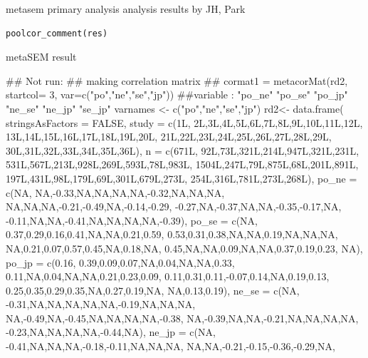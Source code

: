 \documentclass[a4paper]{book}
\begin{document}
%
\begin{Description}
metasem primary analysis analysis results by JH, Park
\end{Description}
%
\begin{Usage}
\begin{verbatim}
poolcor_comment(res)
\end{verbatim}
\end{Usage}
%
\begin{Arguments}
\begin{ldescription}
\item[\code{res}] metaSEM result
\end{ldescription}
\end{Arguments}
%
\begin{Examples}
\begin{ExampleCode}
\#\# Not run: 
## making correlation matrix ##
cormat1 = metacorMat(rd2, startcol= 3, var=c("po","ne","se","jp"))
 ##variable : "po_ne" "po_se" "po_jp" "ne_se" "ne_jp" "se_jp"
 varnames <- c("po","ne","se","jp")
rd2<- data.frame(
  stringsAsFactors = FALSE,
  study = c(1L,
            2L,3L,4L,5L,6L,7L,8L,9L,10L,11L,12L,
            13L,14L,15L,16L,17L,18L,19L,20L,
            21L,22L,23L,24L,25L,26L,27L,28L,29L,
            30L,31L,32L,33L,34L,35L,36L),
  n = c(671L,
        92L,73L,321L,214L,947L,321L,231L,
        531L,567L,213L,928L,269L,593L,78L,983L,
        1504L,247L,79L,875L,68L,201L,891L,
        197L,431L,98L,179L,69L,301L,679L,273L,
        254L,316L,781L,273L,268L),
  po_ne = c(NA,
            NA,-0.33,NA,NA,NA,NA,-0.32,NA,NA,NA,
            NA,NA,NA,-0.21,-0.49,NA,-0.14,-0.29,
            -0.27,NA,-0.37,NA,NA,-0.35,-0.17,NA,
            -0.11,NA,NA,-0.41,NA,NA,NA,NA,-0.39),
  po_se = c(NA,
            0.37,0.29,0.16,0.41,NA,NA,0.21,0.59,
            0.53,0.31,0.38,NA,NA,0.19,NA,NA,NA,
            NA,0.21,0.07,0.57,0.45,NA,0.18,NA,
            0.45,NA,NA,0.09,NA,NA,0.37,0.19,0.23,
            NA),
  po_jp = c(0.16,
            0.39,0.09,0.07,NA,0.04,NA,NA,0.33,
            0.11,NA,0.04,NA,NA,0.21,0.23,0.09,
            0.11,0.31,0.11,-0.07,0.14,NA,0.19,0.13,
            0.25,0.35,0.29,0.35,NA,0.27,0.19,NA,
            NA,0.13,0.19),
  ne_se = c(NA,
            -0.31,NA,NA,NA,NA,NA,-0.19,NA,NA,NA,
            NA,-0.49,NA,-0.45,NA,NA,NA,NA,-0.38,
            NA,-0.39,NA,NA,-0.21,NA,NA,NA,NA,
            -0.23,NA,NA,NA,NA,-0.44,NA),
  ne_jp = c(NA,
            -0.41,NA,NA,NA,-0.18,-0.11,NA,NA,NA,
            NA,NA,-0.21,-0.15,-0.36,-0.29,NA,

\end{ExampleCode}
\end{Examples}
\end{document}
